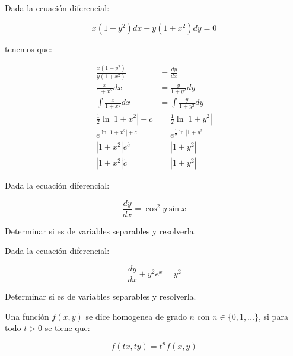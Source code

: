		\begin{ejemplo}
			Dada la ecuación diferencial:

			\begin{equation*}
				x (1 + y^2) dx - y (1 + x^2) dy = 0
			\end{equation*}

			tenemos que:

			\begin{align*}
				\frac{x (1 + y^2)}{y (1 + x^2)} &= \frac{dy}{dx} \\
				\frac{x}{1 + x^2}dx &= \frac{y}{1 + y^2}dy \\
				\int \frac{x}{1 + x^2}dx &= \int \frac{y}{1 + y^2}dy \\
				\frac{1}{2} \ln{|1 + x^2|} + c &= \frac{1}{2} \ln{|1 + y^2|} \\
				e^{\ln{|1 + x^2|} + c} &= e^{\frac{1}{2} \ln{|1 + y^2|}} \\
				|1 + x^2| e^{\bar{c}} &= |1 + y^2| \\
				|1 + x^2| \tilde{c} &= |1 + y^2|
			\end{align*}
		\end{ejemplo}

		\begin{ejercicio}
			Dada la ecuación diferencial:

			\begin{equation*}
				\frac{dy}{dx} = \cos^2{y} \sin{x}
			\end{equation*}

			Determinar si es de variables separables y resolverla.
		\end{ejercicio}

		\begin{ejercicio}
			Dada la ecuación diferencial:

			\begin{equation*}
				\frac{dy}{dx} + y^2 e^x = y^2
			\end{equation*}

			Determinar si es de variables separables y resolverla.
		\end{ejercicio}

		\begin{definicion}
			Una función $f(x, y)$ se dice homogenea de grado $n$ con $n \in \{0, 1, \dots\}$, si para todo $t > 0$ se tiene que:

			\begin{equation}
				f(tx, ty) = t^n f(x, y)
			\end{equation}
		\end{definicion}


